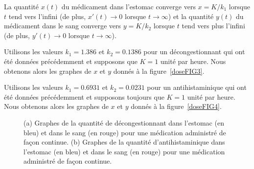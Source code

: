 {\begin{egg}
La quantité $x(t)$ du médicament dans l'estomac converge vers
$x = K/k_1$ lorsque $t$ tend vers l'infini (de plus,
$x'(t) \rightarrow 0$ lorsque $t \rightarrow \infty$) et la quantité $y(t)$
du médicament dans le sang converge vers $y = K/k_2$ lorsque $t$
tend vers plus l'infini (de plus, $y'(t) \rightarrow 0$ lorsque
$t \rightarrow \infty$).

Utilisons les valeurs $k_1 = 1.386$ et $k_2 = 0.1386$ pour un
décongestionnant qui ont été données précédemment et supposons que
$K=1$ unité par heure.  Nous obtenons alors les graphes de $x$ et $y$ donnés
à la figure~\ref{doseFIG3}.

Utilisons les valeurs $k_1=0.6931$ et $k_2=0.0231$ pour un
antihistaminique qui ont été données précédemment et supposons
toujours que $K=1$ unité par heure.  Nous obtenons alors les graphes de $x$
et $y$ donnés à la figure~\ref{doseFIG4}.

\begin{figure}
\centering
{}
\qquad
{}
\caption[Graphes de la quantité de décongestionnant et
d'antihistaminique dans l'estomac et dans le sang pour une médication
administré de façon continue]
{(a) Graphes de la quantité de décongestionnant dans l'estomac (en
bleu) et dans le sang (en rouge) pour une médication administré de
façon continue.
(b) Graphes de la quantité d'antihistaminique dans l'estomac (en
bleu) et dans le sang (en rouge) pour une médication administré de
façon continue.}\label{doseFIG34}
\end{figure}


\end{egg}}
